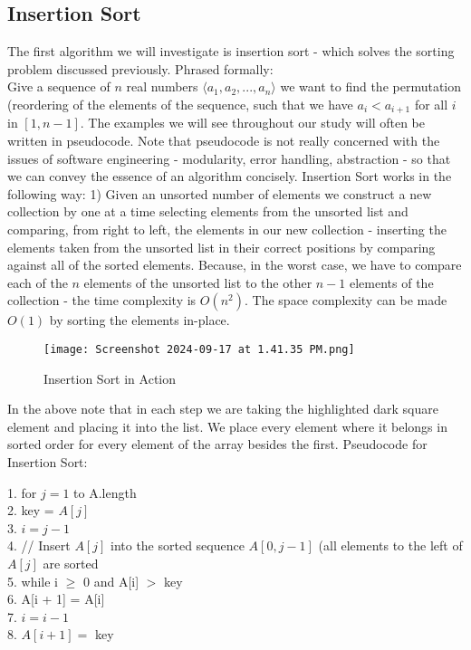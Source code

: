 \documentclass{scrartcl}
\theoremstyle{definition}
\theoremstyle{definition}
\theoremstyle{remark}
\numberwithin{equation}{section}
\begin{document}
\subsection{Insertion Sort}
The first algorithm we will investigate is insertion sort - which solves the sorting problem discussed previously. Phrased formally:\\
Give a sequence of $n$ real numbers $\langle{a_1,a_2,...,a_n}\rangle$ we want to find the permutation (reordering of the elements of the sequence, such that we have $a_i < a_{i+1}$
for all $i$ in $[1,n-1]$. The examples we will see throughout our study will often be written in pseudocode. Note that pseudocode is not really concerned with the issues of software engineering - modularity, error handling, abstraction - so that we can convey the essence of an algorithm concisely. Insertion Sort works in the following way: 1) Given an unsorted number of elements we construct a new collection by one at a time selecting elements from the unsorted list and comparing, from right to left, the elements in our new collection - inserting the elements taken from the unsorted list in their correct positions by comparing against all of the sorted elements. Because, in the worst case, we have to compare each of the $n$ elements of the unsorted list to the other $n-1$ elements of the collection - the time complexity is $O(n^2)$. The space complexity can be made $O(1)$ by sorting the elements in-place.
\begin{figure}[h]
\centering
\texttt{[image: Screenshot 2024-09-17 at 1.41.35 PM.png]}
\caption{Insertion Sort in Action}
\end{figure}
In the above note that in each step we are taking the highlighted dark square element and placing it into the list. We place every element where it belongs in sorted order for every element of the array besides the first. Pseudocode for Insertion Sort:
\begin{itemize}
    1. for $j = 1$ to A.length \\
    2.     \hspace{1cm}key = $A[j]$\\
    3.     \hspace{1cm}$i = j - 1$ \\
    4.     \hsapce{1cm}// Insert $A[j]$ into the sorted sequence $A[0,j-1]$ (all elements to the left of $A[j]$ are sorted \\
    5.     \hspace{1cm}while i $\geq$ 0 and A[i] $>$ key \\
    6.         \hspace{2cm}A[i + 1] = A[i] \\
    7.         \hspace{2cm}$i = i - 1$ \\
    8.     \hspace{1cm}$A[i + 1] =$ key
\end{itemize}
\end{document}
